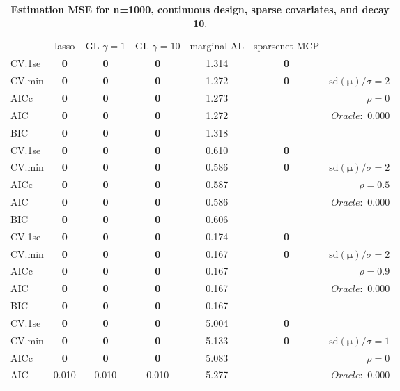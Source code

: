 \clearpage
\begin{table}\vspace{-.5cm}
\caption[l]{ { \bf Estimation MSE for n=1000, continuous design, 
sparse covariates, and  decay  10}.}
\vspace{-.5cm}
\footnotesize{}
\begin{center}
\begin{tabular}{l*{5}{c}|r}
& lasso & GL $\gamma=1$ & GL $\gamma=10$ & marginal AL & sparsenet MCP  & \\
 \cline{1-7}
CV.1se & {\bf 0} & {\bf 0} & {\bf 0} & 1.314 & {\bf 0} & \\
CV.min & {\bf 0} & {\bf 0} & {\bf 0} & 1.272 & {\bf 0} &  $\mathrm{sd}(\mathbf{\mu})/\sigma=2$ \\
AICc & {\bf 0} & {\bf 0} & {\bf 0} & 1.273 & & $\rho=0$ \\
AIC & {\bf 0} & {\bf 0} & {\bf 0} & 1.272 & &  \multirow{2}{*}{$Oracle: $ 0.000} \\
BIC & {\bf 0} & {\bf 0} & {\bf 0} & 1.318 & &  \\
 \hline 
CV.1se & {\bf 0} & {\bf 0} & {\bf 0} & 0.610 & {\bf 0} & \\
CV.min & {\bf 0} & {\bf 0} & {\bf 0} & 0.586 & {\bf 0} &  $\mathrm{sd}(\mathbf{\mu})/\sigma=2$ \\
AICc & {\bf 0} & {\bf 0} & {\bf 0} & 0.587 & & $\rho=0.5$ \\
AIC & {\bf 0} & {\bf 0} & {\bf 0} & 0.586 & &  \multirow{2}{*}{$Oracle: $ 0.000} \\
BIC & {\bf 0} & {\bf 0} & {\bf 0} & 0.606 & &  \\
 \hline 
CV.1se & {\bf 0} & {\bf 0} & {\bf 0} & 0.174 & {\bf 0} & \\
CV.min & {\bf 0} & {\bf 0} & {\bf 0} & 0.167 & {\bf 0} &  $\mathrm{sd}(\mathbf{\mu})/\sigma=2$ \\
AICc & {\bf 0} & {\bf 0} & {\bf 0} & 0.167 & & $\rho=0.9$ \\
AIC & {\bf 0} & {\bf 0} & {\bf 0} & 0.167 & &  \multirow{2}{*}{$Oracle: $ 0.000} \\
BIC & {\bf 0} & {\bf 0} & {\bf 0} & 0.167 & &  \\
 \hline 
CV.1se & {\bf 0} & {\bf 0} & {\bf 0} & 5.004 & {\bf 0} & \\
CV.min & {\bf 0} & {\bf 0} & {\bf 0} & 5.133 & {\bf 0} &  $\mathrm{sd}(\mathbf{\mu})/\sigma=1$ \\
AICc & {\bf 0} & {\bf 0} & {\bf 0} & 5.083 & & $\rho=0$ \\
AIC & 0.010 & 0.010 & 0.010 & 5.277 & &  \multirow{2}{*}{$Oracle: $ 0.000} \\

\end{tabular}
\end{center}
\end{table}
